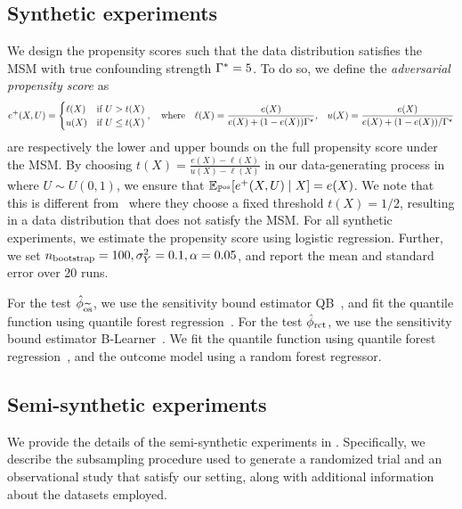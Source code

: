 \subsection{Synthetic experiments}
\label{apx:syn_exp}
We design the propensity scores such that the data distribution satisfies the MSM with true confounding strength $\Gamma^*=5$. To do so, we define the \emph{adversarial propensity score} as 
\begin{align*}
&e^+(X,U) = \begin{cases}
        \ell(X) & \text{if } U>t(X) \\
        u(X) & \text{if }  U \leq t(X)
    \end{cases}, \quad \text{where} \quad \ell(X)=\frac{e(X)}{e(X)+(1-e(X))\Gamma^{\star}},  &u(X)=\frac{e(X)}{e(X)+(1-e(X)) / \Gamma^{\star}}
\end{align*}
are respectively the lower and upper bounds on the full propensity score under the MSM. 
By choosing $t(X) = \frac{e(X) - \ell(X)}{u(X) -\ell(X)}$ in our data-generating process in~ where $U \sim U(0,1)$, we ensure 
that $\mathbb{E}_{\mathbb{P}^{\operatorname{os}}}[e^+(X,U) \mid X] = e(X)$. 
We note that this is different from~\cite{kallus2019interval,jesson2021quantifying,oprescu2023b} where they choose a fixed threshold $t(X)=1/2$, resulting in a data distribution that does not satisfy the MSM. For all synthetic experiments, we estimate the propensity score using logistic regression. Further, we set $n_{\text{bootstrap}} = 100, \sigma^2_Y=0.1, \alpha=0.05$, and report the mean and standard error over 20 runs. 


For the test $\hat{\phi}_{\widetilde{\mathrm{os}}}$, we use the sensitivity bound estimator QB~\citep{dorn2022sharp}, and fit the quantile function using quantile forest regression~\citep{meinshausen2006quantile}. For the test $\hat{\phi}_{\mathrm{rct}}$, we use the sensitivity bound estimator B-Learner~\citep{oprescu2023b}. We fit the quantile function using quantile forest regression~\citep{meinshausen2006quantile}, and the outcome model using a random forest regressor.

\subsection{Semi-synthetic experiments}
\label{apx:semisyn_exp}
We provide the details of the semi-synthetic experiments in . Specifically, we describe the subsampling procedure used to generate a randomized trial and an observational study that satisfy our setting, along with additional information about the datasets employed.

